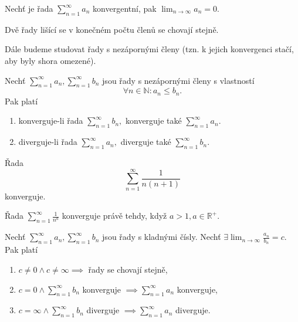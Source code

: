 \begin{veta}
    Nechť je řada $\sum_{n=1}^\infty a_n$ konvergentní, pak $\lim_{n\to\infty} a_n=0.$
\end{veta}

\begin{veta}
    Dvě řady lišící se v konečném počtu členů se chovají stejně.
\end{veta}

\begin{pozn}
    Dále budeme studovat řady s nezápornými členy (tzn. k jejich konvergenci stačí, aby byly shora omezené).
\end{pozn}

\begin{veta}
Nechť $\sum_{n=1}^\infty a_n, \sum_{n=1}^\infty b_n$ jsou řady s nezápornými členy
s vlastností
$$\forall n \in \mathbb N\colon a_n \leq b_n.$$
Pak platí
\begin{enumerate}[$i.$]
\item konverguje-li řada $\sum_{n=1}^\infty b_n,$ konverguje také $\sum_{n=1}^\infty a_n.$
\item diverguje-li řada $\sum_{n=1}^\infty a_n,$ diverguje také $\sum_{n=1}^\infty b_n.$
\end{enumerate}
\end{veta}

\begin{pozn}
    Řada
    $$\sum_{n=1}^\infty \frac{1}{n(n+1)}$$
    konverguje.
\end{pozn}

\begin{veta}
    Řada $\sum_{n=1}^\infty \frac{1}{n^a}$ konverguje právě tehdy, když $a>1, a\in \mathbb R^+.$
\end{veta}

\begin{veta}
Nechť $\sum_{n=1}^\infty a_n, \sum_{n=1}^\infty b_n$ jsou řady s kladnými čísly.
Nechť $\exists \lim_{n\to\infty}\frac{a_n}{b_n}=c.$ Pak platí
\begin{enumerate}[$i.$]
\item $c\ne 0\land c\ne \infty \implies$ řady se chovají stejně,
\item $c=0 \land \sum_{n=1}^\infty b_n$ konverguje $\implies \sum_{n=1}^\infty a_n$ konverguje,
\item $c=\infty \land \sum_{n=1}^\infty b_n$ diverguje $\implies \sum_{n=1}^\infty a_n$ diverguje.
\end{enumerate}
\end{veta}

